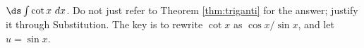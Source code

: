 {$\ds \int \cot x\ dx$. Do not just refer to Theorem \ref{thm:triganti} for the answer; justify it through Substitution.
}
{The key is to rewrite $\cot x$ as $\cos x/\sin x$, and let $u=\sin x$.
}
